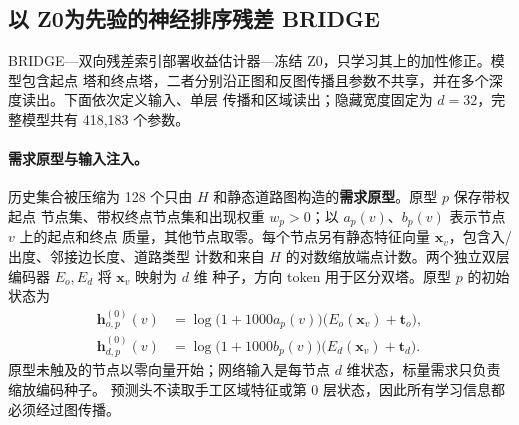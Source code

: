 \documentclass[UTF8,a4paper,10pt,twocolumn]{ctexart}
\newcommand{\zmethod}{Z0}
\newcommand{\gmethod}{BRIDGE}
\begin{document}
\subsection{以 \zmethod 为先验的神经排序残差 \gmethod}

\gmethod---双向残差索引部署收益估计器---冻结 \zmethod，只学习其上的加性修正。模型包含起点
塔和终点塔，二者分别沿正图和反图传播且参数不共享，并在多个深度读出。下面依次定义输入、单层
传播和区域读出；隐藏宽度固定为 $d=32$，完整模型共有 418,183 个参数。

\paragraph{需求原型与输入注入。}
历史集合被压缩为 128 个只由 $H$ 和静态道路图构造的\textbf{需求原型}。原型 $p$ 保存带权起点
节点集、带权终点节点集和出现权重 $w_p>0$；以 $a_p(v)$、$b_p(v)$ 表示节点 $v$ 上的起点和终点
质量，其他节点取零。每个节点另有静态特征向量 $\bm{x}_v$，包含入/出度、邻接边长度、道路类型
计数和来自 $H$ 的对数缩放端点计数。两个独立双层编码器 $E_o,E_d$ 将 $\bm{x}_v$ 映射为 $d$ 维
种子，方向 token 用于区分双塔。原型 $p$ 的初始状态为
\begin{equation}
  \begin{aligned}
  \bm{h}_{o,p}^{(0)}(v)&=\log\!\bigl(1+1000a_p(v)\bigr)
  \bigl(E_o(\bm{x}_v)+\bm{t}_o\bigr),\\
  \bm{h}_{d,p}^{(0)}(v)&=\log\!\bigl(1+1000b_p(v)\bigr)
  \bigl(E_d(\bm{x}_v)+\bm{t}_d\bigr).
  \end{aligned}
  \label{eq:injection}
\end{equation}
原型未触及的节点以零向量开始；网络输入是每节点 $d$ 维状态，标量需求只负责缩放编码种子。
预测头不读取手工区域特征或第 0 层状态，因此所有学习信息都必须经过图传播。
\end{document}
